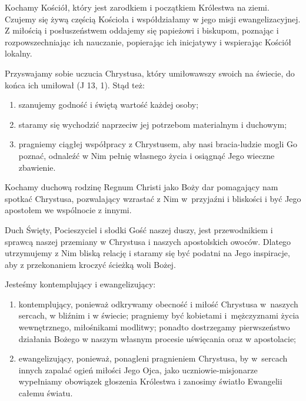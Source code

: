  Kochamy Kościół, który jest zarodkiem i początkiem Królestwa na ziemi. Czujemy się żywą częścią Kościoła i współdziałamy w jego misji ewangelizacyjnej. Z miłością i posłuszeństwem oddajemy się papieżowi i biskupom, poznając i rozpowszechniając ich nauczanie, popierając ich inicjatywy i wspierając Kościół lokalny.


 
 Przyswajamy sobie uczucia Chrystusa, który umiłowawszy swoich na świecie, do końca ich umiłował (J 13, 1). Stąd też:


\begin{enumerate}


\item szanujemy godność i świętą wartość każdej osoby;


\item staramy się wychodzić naprzeciw jej potrzebom materialnym i duchowym;


\item pragniemy ciągłej współpracy z Chrystusem, aby nasi bracia-ludzie mogli Go poznać, odnaleźć w Nim pełnię własnego życia i osiągnąć Jego wieczne zbawienie.


\end{enumerate}


\filbreak
{}
 
 Kochamy duchową rodzinę Regnum Christi jako Boży dar pomagający nam spotkać Chrystusa, pozwalający wzrastać z Nim \mbox{w przyjaźni} i bliskości i być Jego apostołem we wspólnocie z innymi.
 
 
 Duch Święty, Pocieszyciel i słodki Gość naszej duszy, jest przewodnikiem i sprawcą naszej przemiany w Chrystusa i naszych apostolskich owoców. Dlatego utrzymujemy z Nim bliską relację i staramy się być podatni na Jego inspiracje, aby z przekonaniem kroczyć ścieżką woli Bożej.
 
 
 Jesteśmy kontemplujący i ewangelizujący:


\begin{enumerate}


\item kontemplujący, ponieważ odkrywamy obecność i miłość Chrystusa \mbox{w naszych} sercach, w bliźnim i w świecie; pragniemy być kobietami \mbox{i mężczyznami} życia wewnętrznego, miłośnikami modlitwy; ponadto dostrzegamy pierwszeństwo działania Bożego w naszym własnym procesie uświęcania oraz w apostolacie;


\item ewangelizujący, ponieważ, ponagleni pragnieniem Chrystusa, by \mbox{w sercach} innych zapalać ogień miłości Jego Ojca, jako uczniowie-misjonarze wypełniamy obowiązek głoszenia Królestwa i zanosimy światło Ewangelii całemu światu.


\end{enumerate}


